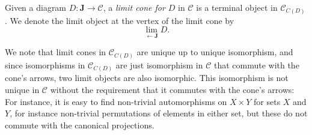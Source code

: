 \documentclass[article, a4paper, 11pt, oneside]{memoir}
\numberwithin{equation}{chapter}
\newcommand{\cat}[1]{\mathcal{#1}}
\newcommand{\scat}[1]{\mathbf{#1}} %
\newcommand{\catC}{\cat{C}}
\newcommand{\scatJ}{\scat{J}}
\newcommand{\from}{\leftarrow}
\theoremstyle{myexample}
\theoremstyle{myexamplebreak}
\begin{document}
\begin{definition}
    Given a diagram $D \colon \scatJ \to \catC$, a \emph{limit cone for $D$} in $\catC$ is a terminal object in $\catC_{C(D)}$. We denote the limit object at the vertex of the limit cone by
    \begin{equation*}
        \lim_{\from \scatJ} D.
    \end{equation*}
\end{definition}
%
We note that limit cones in $\catC_{C(D)}$ are unique up to unique isomorphism, and since isomorphisms in $\catC_{C(D)}$ are just isomorphism in $\catC$ that commute with the cone's arrows, two limit objects are also isomorphic. This isomorphism is not unique in $\catC$ without the requirement that it commutes with the cone's arrows: For instance, it is easy to find non-trivial automorphisms on $X \times Y$ for sets $X$ and $Y$, for instance non-trivial permutations of elements in either set, but these do not commute with the canonical projections.
\end{document}
